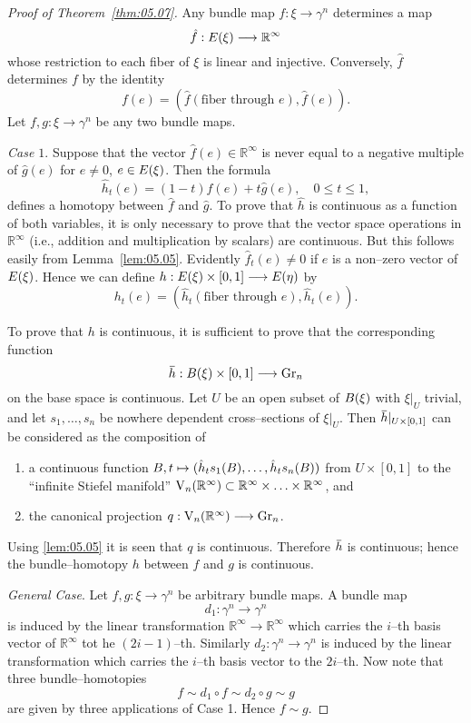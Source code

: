 \documentclass[../main]{subfiles}
\begin{document}
\begin{proof}[Proof of Theorem~\ref{thm:05.07}]
Any bundle map $f : \xi \longrightarrow \gamma^n$ determines a map \[\hat f : E(\xi) \longrightarrow {\mathbb R}^\infty\] whose restriction to each fiber of $\xi$ is linear and injective. Conversely, $\hat f$ determines $f$ by the identity \[f(e) = ({\hat f}(\text{fiber through } e), {\hat f}(e)).\] Let $f, g : \xi \longrightarrow \gamma^n$ be any two bundle maps. 

\emph{Case $1$}. Suppose that the vector ${\hat f}(e) \in {\mathbb R}^\infty$ is never equal to a negative multiple of ${\hat g}(e)$ for $e \ne 0$, $e \in E(\xi)$. Then the formula \[{\hat h}_t(e) = (1 - t) {\hat f}(e) + t {\hat g}(e), \quad 0 \le t \le 1,\] defines a homotopy between ${\hat f}$ and ${\hat g}$. To prove that $\hat h$ is continuous as a function of both variables, it is only necessary to prove that the vector space operations in ${\mathbb R}^\infty$ (i.e., addition and multiplication by scalars) are continuous. But this follows easily from Lemma~\ref{lem:05.05}. Evidently ${\hat f}_t(e) \ne 0$ if $e$ is a non--zero vector of $E(\xi)$. Hence we can define $h : E(\xi) \times [0, 1] \longrightarrow E(\eta)$ by \[h_t(e) = ({\hat h}_t(\text{fiber through } e), {\hat h}_t(e)).\] 

To prove that $h$ is continuous, it is sufficient to prove that the corresponding function \[\xoverline h : \base(\xi) \times [0, 1] \longrightarrow \grassmannian_n\] on the base space is continuous. Let $U$ be an open subset of $B(\xi)$ with $\xi |_U$ trivial, and let $s_1, \ldots, s_n$ be nowhere dependent cross--sections of $\xi |_U$. Then $\xoverline h |_{U \times [0,1]}$ can be considered as the composition of
\begin{enumerate}[label=\arabic*)]
    \item a continuous function $B, t \mapsto ({\hat h}_t s_1(B), \ldots, {\hat h}_t s_n(B))$ from $U \times [0, 1]$ to the ``infinite Stiefel manifold'' $\operatorname{V}_n({\mathbb R}^\infty) \subset {\mathbb R}^\infty \times \ldots \times {\mathbb R}^\infty$, and
    \item the canonical projection $q : \operatorname{V}_n({\mathbb R}^\infty) \longrightarrow \operatorname{Gr}_n$.
\end{enumerate} 
Using \ref{lem:05.05} it is seen that $q$ is continuous. Therefore $\xoverline h$ is continuous; hence the bundle--homotopy $h$ between $f$ and $g$ is continuous. 

\emph{General Case}. Let $f, g : \xi \longrightarrow \gamma^n$ be arbitrary bundle maps. A bundle map \[d_1 : \gamma^n \longrightarrow \gamma^n\] is induced by the linear transformation ${\mathbb R}^\infty \longrightarrow {\mathbb R}^\infty$ which carries the $i$--th basis vector of ${\mathbb R}^\infty$ tot he $(2 i - 1)$--th. Similarly $d_2 : \gamma^n \longrightarrow \gamma^n$ is induced by the linear transformation which carries the $i$--th basis vector to the $2i$--th. Now note that three bundle--homotopies \[f \sim d_1 \circ f \sim d_2 \circ g \sim g\] are given by three applications of Case 1. Hence $f \sim g$.
\end{proof}
\end{document}
